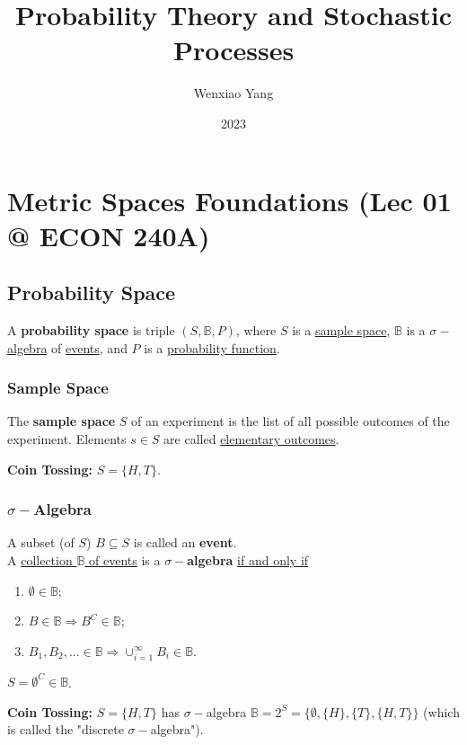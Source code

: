 \documentclass[11pt]{elegantbook}
\title{Probability Theory and Stochastic Processes}
\author{Wenxiao Yang}
\institute{Haas School of Business, University of California Berkeley}
\date{2023}
\begin{document}
\maketitle

\frontmatter
\tableofcontents

\mainmatter


\chapter{Metric Spaces Foundations \small{(Lec 01 @ ECON 240A)}}
\section{Probability Space}
\begin{definition}
    \normalfont
    A \textbf{probability space} is triple $(S,\mathbb{B},P)$, where $S$ is a \underline{sample space}, $\mathbb{B}$ is a \underline{$\sigma-$algebra} of \underline{events}, and $P$ is a \underline{probability function}.
\end{definition}

\subsection{Sample Space}
\begin{definition}
    \normalfont
    The \textbf{sample space} $S$ of an experiment is the list of all possible outcomes of the experiment. Elements $s\in S$ are called \underline{elementary outcomes}.
\end{definition}
\begin{example}
    \textbf{Coin Tossing:} $S=\{H,T\}$.
\end{example}

\subsection{$\sigma-$Algebra}
\begin{definition}
    \normalfont
    A subset (of $S$) $B\subseteq S$ is called an \textbf{event}.\\
    A \underline{collection $\mathbb{B}$ of events} is a \textbf{$\sigma-$algebra} \underline{if and only if}
    \begin{enumerate}
        \item $\emptyset\in \mathbb{B}$;
        \item $B\in \mathbb{B} \Rightarrow B^C \in \mathbb{B}$;
        \item $B_1,B_2,...\in \mathbb{B} \Rightarrow \cup_{i=1}^\infty B_i\in \mathbb{B}$.
    \end{enumerate}
\end{definition}
\begin{note}
    $S=\emptyset^C\in \mathbb{B}$.
\end{note}
\begin{example}
    \textbf{Coin Tossing:} $S=\{H,T\}$ has $\sigma-$algebra $\mathbb{B}=2^S=\{\emptyset,\{H\},\{T\},\{H,T\}\}$ (which is called the "discrete $\sigma-$algebra").
\end{example}
\end{document}
